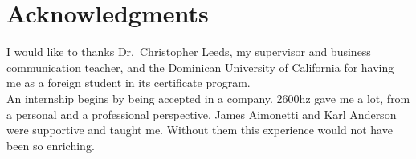 \chapter*{Acknowledgments}
\label{ch:ack}

I would like to thanks Dr.~Christopher Leeds, my supervisor and business communication teacher, and the Dominican University of California for having me as a foreign student in its certificate program.\\

An internship begins by being accepted in a company. 2600hz gave me a lot, from a personal and a professional perspective. James Aimonetti and Karl Anderson were supportive and taught me. Without them this experience would not have been so enriching.